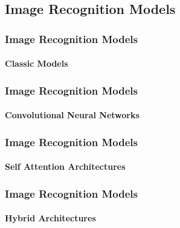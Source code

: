 \subsection*{Image Recognition Models}
\begin{frame}[t]
    \frametitle{Image Recognition Models}
    \framesubtitle{Classic Models}
\end{frame}
\begin{frame}[t]
    \frametitle{Image Recognition Models}
    \framesubtitle{Convolutional Neural Networks}
    
    
\end{frame}
\begin{frame}[t]
    \frametitle{Image Recognition Models}
    \framesubtitle{Self Attention Architectures}
    
\end{frame}
\begin{frame}[t]
    \frametitle{Image Recognition Models}
    \framesubtitle{Hybrid Architectures}
    
\end{frame}